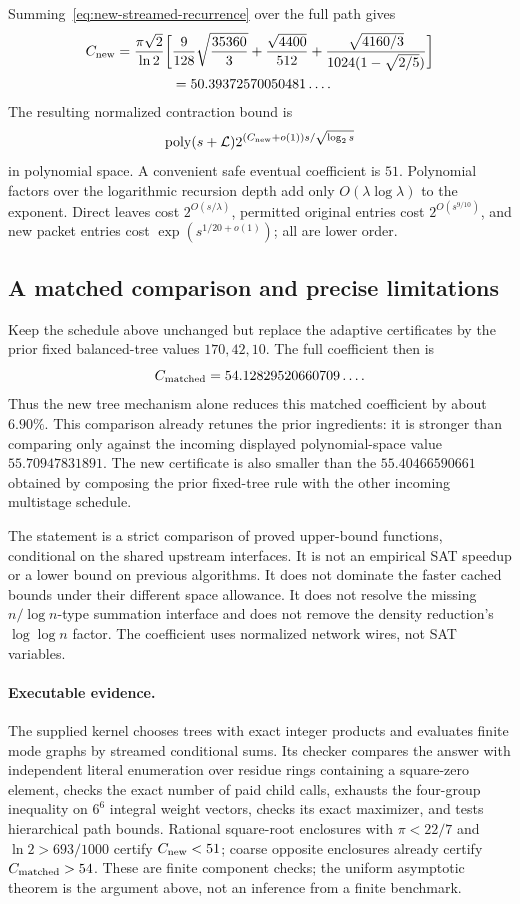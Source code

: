 Summing~\eqref{eq:new-streamed-recurrence} over the full path gives
\begin{align}
 C_{\rm new}=
 \frac{\pi\sqrt2}{\ln2}\bigg[&
 \frac9{128}\sqrt{\frac{35360}{3}}
 +\frac{\sqrt{4400}}{512}
 +\frac{\sqrt{4160/3}}{1024(1-\sqrt{2/5})}\bigg]
 \label{eq:new-final-coefficient}\\
 &=50.39372570050481\ldots.\notag
\end{align}
The resulting normalized contraction bound is
\[
 \operatorname{poly}(s+\mathcal L)
 2^{(C_{\rm new}+o(1))s/\sqrt{\log_2s}}
\]
in polynomial space. A convenient safe eventual coefficient is $51$.
Polynomial factors over the logarithmic recursion depth add only
$O(\lambda\log\lambda)$ to the exponent. Direct leaves cost
$2^{O(s/\lambda)}$, permitted original entries cost $2^{O(s^{9/10})}$,
and new packet entries cost $\exp(s^{1/20+o(1)})$; all are lower order.

\subsection{A matched comparison and precise limitations}
Keep the schedule above unchanged but replace the adaptive certificates
by the prior fixed balanced-tree values $170,42,10$. The full coefficient
then is
\[
 C_{\rm matched}=54.12829520660709\ldots.
\]
Thus the new tree mechanism alone reduces this matched coefficient by about
$6.90\%$. This comparison already retunes the prior ingredients: it is
stronger than comparing only against the incoming displayed polynomial-space
value $55.70947831891$. The new certificate is also smaller than the
$55.40466590661$ obtained by composing the prior fixed-tree rule with the
other incoming multistage schedule.

The statement is a strict comparison of proved upper-bound functions,
conditional on the shared upstream interfaces. It is not an empirical
SAT speedup or a lower bound on previous algorithms. It does not dominate
the faster cached bounds under their different space allowance. It does
not resolve the missing $n/\log n$-type summation interface and does not
remove the density reduction's $\log\log n$ factor. The coefficient uses
normalized network wires, not SAT variables.

\paragraph{Executable evidence.}
The supplied kernel chooses trees with exact integer products and evaluates
finite mode graphs by streamed conditional sums. Its checker compares the
answer with independent literal enumeration over residue rings containing
a square-zero element, checks the exact number of paid child calls, exhausts
the four-group inequality on $6^6$ integral weight vectors, checks its exact
maximizer, and tests hierarchical path bounds. Rational square-root
enclosures with $\pi<22/7$ and $\ln2>693/1000$ certify $C_{\rm new}<51$;
coarse opposite enclosures already certify $C_{\rm matched}>54$.
These are finite component checks; the uniform asymptotic theorem is the
argument above, not an inference from a finite benchmark.
